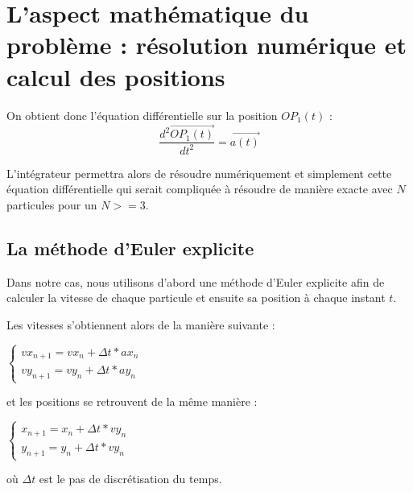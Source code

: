 \section{L'aspect mathématique du problème : résolution numérique et calcul des positions}

On obtient donc l'équation différentielle sur la position $OP_1(t)$ :
\begin{equation}
\frac{d^2 \vec{OP_1(t)}}{dt^2} = \vec{a(t)}
\end{equation}

L'intégrateur permettra alors de résoudre numériquement et simplement cette équation différentielle qui serait compliquée à résoudre de manière exacte avec $N$ particules pour un $N>=3$.

\vspace{2mm}

\subsection{La méthode d'Euler explicite}

Dans notre cas, nous utilisons d'abord une méthode d'Euler explicite afin de calculer la vitesse de chaque particule et ensuite sa position à chaque instant $t$.

\vspace{2mm}
Les vitesses s'obtiennent alors de la manière suivante :
\vspace{2mm}

$
\left\{
    \begin{array}{ll}
        vx_{n+1} =vx_{n} + \Delta t *ax_{n} \\
        vy_{n+1} =vy_{n} + \Delta t *ay_{n}
    \end{array}
\right.
$

\vspace{2mm}
et les positions se retrouvent de la même manière :
\vspace{2mm}

$
\left\{
    \begin{array}{ll}
        x_{n+1} =x_{n} + \Delta t *vy_{n} \\
        y_{n+1} =y_{n} + \Delta t *vy_{n}
    \end{array}
\right.
$

\vspace{2mm}

où $\Delta t$ est le pas de discrétisation du temps.

\vspace{2mm}

